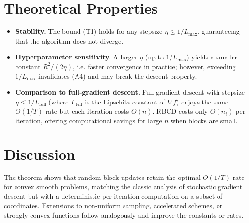 \documentclass{article}
\begin{document}
\section*{Theoretical Properties}
\begin{itemize}
\item \textbf{Stability.} The bound (T1) holds for any stepsize $\eta\le 1/L_{\max}$, guaranteeing that the algorithm does not diverge.
\item \textbf{Hyperparameter sensitivity.} A larger $\eta$ (up to $1/L_{\max}$) yields a smaller constant $R^{2}/(2\eta)$, i.e. faster convergence in practice; however, exceeding $1/L_{\max}$ invalidates (A4) and may break the descent property.
\item \textbf{Comparison to full‑gradient descent.} Full gradient descent with stepsize $\eta\le 1/L_{\text{full}}$ (where $L_{\text{full}}$ is the Lipschitz constant of $\nabla f$) enjoys the same $O(1/T)$ rate but each iteration costs $O(n)$. RBCD costs only $O(n_i)$ per iteration, offering computational savings for large $n$ when blocks are small.
\end{itemize}

\section*{Discussion}
The theorem shows that random block updates retain the optimal $O(1/T)$ rate for convex smooth problems, matching the classic analysis of stochastic gradient descent but with a deterministic per‑iteration computation on a subset of coordinates. Extensions to non‑uniform sampling, accelerated schemes, or strongly convex functions follow analogously and improve the constants or rates.

\newpage
\end{document}
